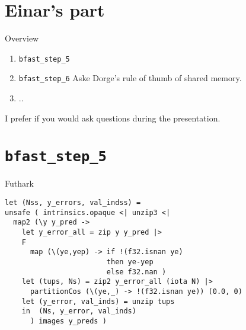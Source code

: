 \section{Einar's part}

\begin{frame}[fragile]{Overview}
\begin{enumerate}
    \item \texttt{bfast\_step\_5}
    \item \texttt{bfast\_step\_6} Aske Dorge's rule of thumb of shared
        memory.
    \item ..
\end{enumerate}
    \pause
    I prefer if you would ask questions during the presentation.
\end{frame}


\section{\texttt{bfast\_step\_5}} %


\begin{frame}[fragile]{Futhark}

%
\begin{verbatim}
let (Nss, y_errors, val_indss) =
unsafe ( intrinsics.opaque <| unzip3 <|
  map2 (\y y_pred ->
    let y_error_all = zip y y_pred |>
    F
      map (\(ye,yep) -> if !(f32.isnan ye) 
                        then ye-yep 
                        else f32.nan )
    let (tups, Ns) = zip2 y_error_all (iota N) |>
      partitionCos (\(ye,_) -> !(f32.isnan ye)) (0.0, 0)
    let (y_error, val_inds) = unzip tups
    in  (Ns, y_error, val_inds)
      ) images y_preds )
\end{verbatim}

\end{frame}

